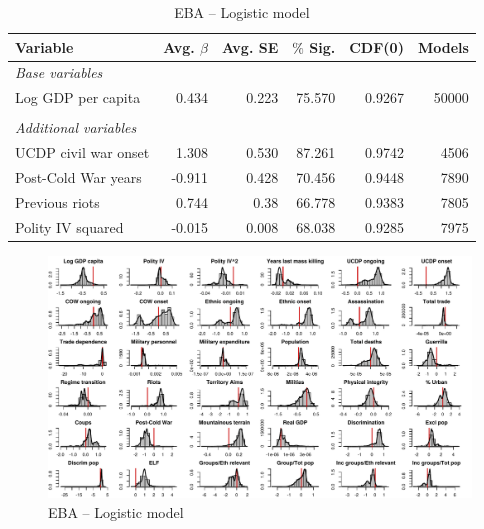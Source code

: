 \begin{table}[H]
\centering
\begin{tabular}{lrrrrr}
\hline
\textbf{Variable} & \textbf{Avg. $\beta$} & \textbf{Avg. SE} & \textbf{$\%$ Sig.} & \textbf{CDF(0)} & \textbf{Models} \\ \hline
\textit{Base variables} &  &  &  &  &  \\
Log GDP per capita & 0.434 & 0.223 & 75.570 & 0.9267 & 50000 \\
 &  &  &  &  &  \\
\textit{Additional variables} &  &  &  &  &  \\
UCDP civil war onset & 1.308 & 0.530 & 87.261 & 0.9742 & 4506 \\
Post-Cold War years & -0.911 & 0.428 & 70.456 & 0.9448 & 7890 \\
Previous riots & 0.744 & 0.38 & 66.778 & 0.9383 & 7805 \\
Polity IV squared & -0.015 & 0.008 & 68.038 & 0.9285 & 7975 \\ \hline
\end{tabular}
\caption{EBA -- Logistic model}
\label{tab:mk-logit}
\end{table}

\clearpage
\begin{figure}
    \centering
    \includegraphics[width=\textwidth]{images/mk-logit.pdf}
    \caption{EBA -- Logistic model}
    \label{fig:mk-logit}
\end{figure}
\clearpage


